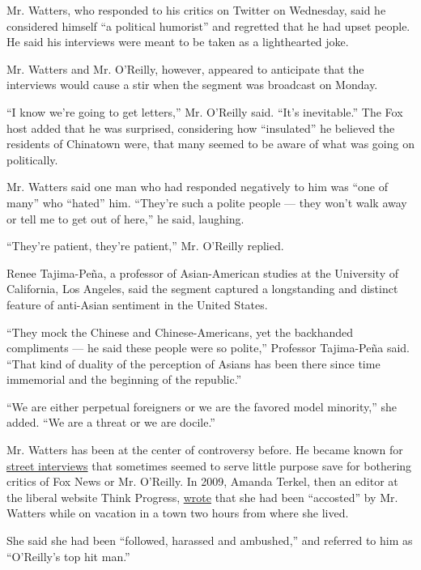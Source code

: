 Mr. Watters, who responded to his critics on Twitter on Wednesday, said
he considered himself ``a political humorist'' and regretted that he had
upset people. He said his interviews were meant to be taken as a
lighthearted joke.

Mr. Watters and Mr. O'Reilly, however, appeared to anticipate that the
interviews would cause a stir when the segment was broadcast on Monday.

``I know we're going to get letters,'' Mr. O'Reilly said. ``It's
inevitable.'' The Fox host added that he was surprised, considering how
``insulated'' he believed the residents of Chinatown were, that many
seemed to be aware of what was going on politically.

Mr. Watters said one man who had responded negatively to him was ``one
of many'' who ``hated'' him. ``They're such a polite people --- they
won't walk away or tell me to get out of here,'' he said, laughing.

``They're patient, they're patient,'' Mr. O'Reilly replied.

Renee Tajima-Peña, a professor of Asian-American studies at the
University of California, Los Angeles, said the segment captured a
longstanding and distinct feature of anti-Asian sentiment in the United
States.

``They mock the Chinese and Chinese-Americans, yet the backhanded
compliments --- he said these people were so polite,'' Professor
Tajima-Peña said. ``That kind of duality of the perception of Asians has
been there since time immemorial and the beginning of the republic.''

``We are either perpetual foreigners or we are the favored model
minority,'' she added. ``We are a threat or we are docile.''

Mr. Watters has been at the center of controversy before. He became
known for
\href{http://www.nytimes3xbfgragh.onion/2009/04/16/arts/television/16ambush.html}{street
interviews} that sometimes seemed to serve little purpose save for
bothering critics of Fox News or Mr. O'Reilly. In 2009, Amanda Terkel,
then an editor at the liberal website Think Progress,
\href{https://thinkprogress.org/i-was-followed-harassed-and-ambushed-by-bill-oreilly-s-producer-2849ba2cb056\#.82cvh2izm}{wrote}
that she had been ``accosted'' by Mr. Watters while on vacation in a
town two hours from where she lived.

She said she had been ``followed, harassed and ambushed,'' and referred
to him as ``O'Reilly's top hit man.''

